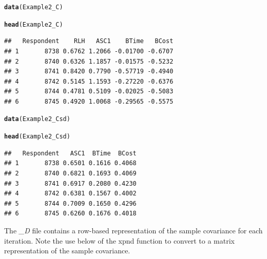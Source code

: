 \documentclass{article}\usepackage{graphicx, color}
\makeatletter
\newcommand{\hlfunctioncall}[1]{\textcolor[rgb]{0.501960784313725,0,0.329411764705882}{\textbf{#1}}}%
\newenvironment{kframe}{%
 \def\at@end@of@kframe{}%
 \ifinner\ifhmode%
  \def\at@end@of@kframe{\end{minipage}}%
  \begin{minipage}{\columnwidth}%
 \fi\fi%
 \def\FrameCommand##1{\hskip\@totalleftmargin \hskip-\fboxsep
 \colorbox{shadecolor}{##1}\hskip-\fboxsep
     \hskip-\linewidth \hskip-\@totalleftmargin \hskip\columnwidth}%
 \MakeFramed {\advance\hsize-\width
   \@totalleftmargin\z@ \linewidth\hsize
   \@setminipage}}%
 {\par\unskip\endMakeFramed%
 \at@end@of@kframe}
\newenvironment{knitrout}{}{} %
\makeatother
\begin{document}
\begin{knitrout}
\color{fgcolor}\begin{kframe}
\begin{alltt}

\hlfunctioncall{data}(Example2_C)

\hlfunctioncall{head}(Example2_C)
\end{alltt}
\begin{verbatim}
##   Respondent    RLH   ASC1    BTime   BCost
## 1       8738 0.6762 1.2066 -0.01700 -0.6707
## 2       8740 0.6326 1.1857 -0.01575 -0.5232
## 3       8741 0.8420 0.7790 -0.57719 -0.4940
## 4       8742 0.5145 1.1593 -0.27220 -0.6376
## 5       8744 0.4781 0.5109 -0.02025 -0.5083
## 6       8745 0.4920 1.0068 -0.29565 -0.5575
\end{verbatim}
\begin{alltt}

\hlfunctioncall{data}(Example2_Csd)

\hlfunctioncall{head}(Example2_Csd)
\end{alltt}
\begin{verbatim}
##   Respondent   ASC1  BTime  BCost
## 1       8738 0.6501 0.1616 0.4068
## 2       8740 0.6821 0.1693 0.4069
## 3       8741 0.6917 0.2080 0.4230
## 4       8742 0.6381 0.1567 0.4002
## 5       8744 0.7009 0.1650 0.4296
## 6       8745 0.6260 0.1676 0.4018
\end{verbatim}
\end{kframe}
\end{knitrout}



The \emph{\_D} file contains a row-based representation of the sample covariance for each iteration. Note the use below of the xpnd function to convert to a matrix representation of the sample covariance.
\end{document}
